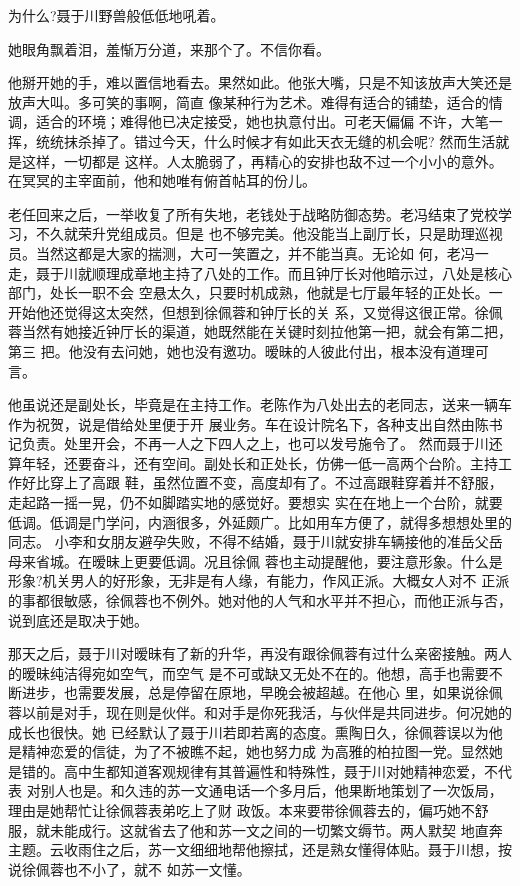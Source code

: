 \documentclass[11pt,a4paper,onecolumn]{article}
\begin{document}
为什么?聂于川野兽般低低地吼着。

她眼角飘着泪，羞惭万分道，来那个了。不信你看。

他掰开她的手，难以置信地看去。果然如此。他张大嘴，只是不知该放声大笑还是放声大叫。多可笑的事啊，简直
像某种行为艺术。难得有适合的铺垫，适合的情调，适合的环境；难得他已决定接受，她也执意付出。可老天偏偏
不许，大笔一挥，统统抹杀掉了。错过今天，什么时候才有如此天衣无缝的机会呢? 然而生活就是这样，一切都是
这样。人太脆弱了，再精心的安排也敌不过一个小小的意外。在冥冥的主宰面前，他和她唯有俯首帖耳的份儿。

老任回来之后，一举收复了所有失地，老钱处于战略防御态势。老冯结束了党校学习，不久就荣升党组成员。但是
也不够完美。他没能当上副厅长，只是助理巡视员。当然这都是大家的揣测，大可一笑置之，并不能当真。无论如
何，老冯一走，聂于川就顺理成章地主持了八处的工作。而且钟厅长对他暗示过，八处是核心部门，处长一职不会
空悬太久，只要时机成熟，他就是七厅最年轻的正处长。一开始他还觉得这太突然，但想到徐佩蓉和钟厅长的关
系，又觉得这很正常。徐佩蓉当然有她接近钟厅长的渠道，她既然能在关键时刻拉他第一把，就会有第二把，第三
把。他没有去问她，她也没有邀功。暧昧的人彼此付出，根本没有道理可言。

他虽说还是副处长，毕竟是在主持工作。老陈作为八处出去的老同志，送来一辆车作为祝贺，说是借给处里便于开
展业务。车在设计院名下，各种支出自然由陈书记负责。处里开会，不再一人之下四人之上，也可以发号施令了。
然而聂于川还算年轻，还要奋斗，还有空间。副处长和正处长，仿佛一低一高两个台阶。主持工作好比穿上了高跟
鞋，虽然位置不变，高度却有了。不过高跟鞋穿着并不舒服，走起路一摇一晃，仍不如脚踏实地的感觉好。要想实
实在在地上一个台阶，就要低调。低调是门学问，内涵很多，外延颇广。比如用车方便了，就得多想想处里的同志。
小李和女朋友避孕失败，不得不结婚，聂于川就安排车辆接他的准岳父岳母来省城。在暧昧上更要低调。况且徐佩
蓉也主动提醒他，要注意形象。什么是形象?机关男人的好形象，无非是有人缘，有能力，作风正派。大概女人对不
正派的事都很敏感，徐佩蓉也不例外。她对他的人气和水平并不担心，而他正派与否，说到底还是取决于她。

那天之后，聂于川对暧昧有了新的升华，再没有跟徐佩蓉有过什么亲密接触。两人的暧昧纯洁得宛如空气，而空气
是不可或缺又无处不在的。他想，高手也需要不断进步，也需要发展，总是停留在原地，早晚会被超越。在他心
里，如果说徐佩蓉以前是对手，现在则是伙伴。和对手是你死我活，与伙伴是共同进步。何况她的成长也很快。她
已经默认了聂于川若即若离的态度。熏陶日久，徐佩蓉误以为他是精神恋爱的信徒，为了不被瞧不起，她也努力成
为高雅的柏拉图一党。显然她是错的。高中生都知道客观规律有其普遍性和特殊性，聂于川对她精神恋爱，不代表
对别人也是。和久违的苏一文通电话一个多月后，他果断地策划了一次饭局，理由是她帮忙让徐佩蓉表弟吃上了财
政饭。本来要带徐佩蓉去的，偏巧她不舒服，就未能成行。这就省去了他和苏一文之间的一切繁文缛节。两人默契
地直奔主题。云收雨住之后，苏一文细细地帮他擦拭，还是熟女懂得体贴。聂于川想，按说徐佩蓉也不小了，就不
如苏一文懂。
\end{document}
